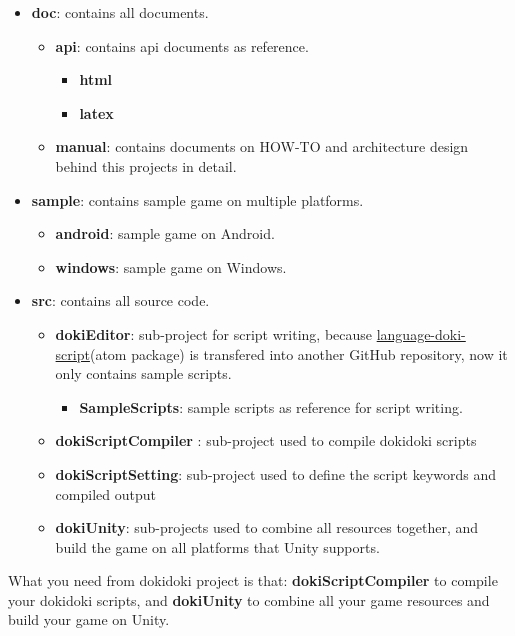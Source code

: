 \begin{itemize}
	\item  \textbf{doc}: contains all documents.
	\begin{itemize}
		\item  \textbf{api}: contains api documents as reference.
		\begin{itemize}
			\item  \textbf{html} 
			\item  \textbf{latex} 
		\end{itemize}
		\item  \textbf{manual}: contains documents on HOW-TO and architecture design behind this projects in detail.
	\end{itemize}
	\item  \textbf{sample}: contains sample game on multiple platforms.
	\begin{itemize}
		\item  \textbf{android}: sample game on Android.
		\item  \textbf{windows}: sample game on Windows.
	\end{itemize}
	\item  \textbf{src}: contains all source code.
	\begin{itemize}
		\item  \textbf{dokiEditor}: sub-project for script writing, because \href{https://github.com/kesumu/language-doki-script}{language-doki-script}(atom package) is transfered into another GitHub repository, now it only contains sample scripts.
		\begin{itemize}
			\item  \textbf{SampleScripts}: sample scripts as reference for script writing.
		\end{itemize}
		\item  \textbf{dokiScriptCompiler} : sub-project used to compile dokidoki scripts
		\item  \textbf{dokiScriptSetting}: sub-project used to define the script keywords and compiled output
		\item  \textbf{dokiUnity}: sub-projects used to combine all resources together, and build the game on all platforms that Unity supports.
	\end{itemize}
\end{itemize}

What you need from dokidoki project is that: \textbf{dokiScriptCompiler} to compile your dokidoki scripts, and \textbf{dokiUnity} to combine all your game resources and build your game on Unity. 

